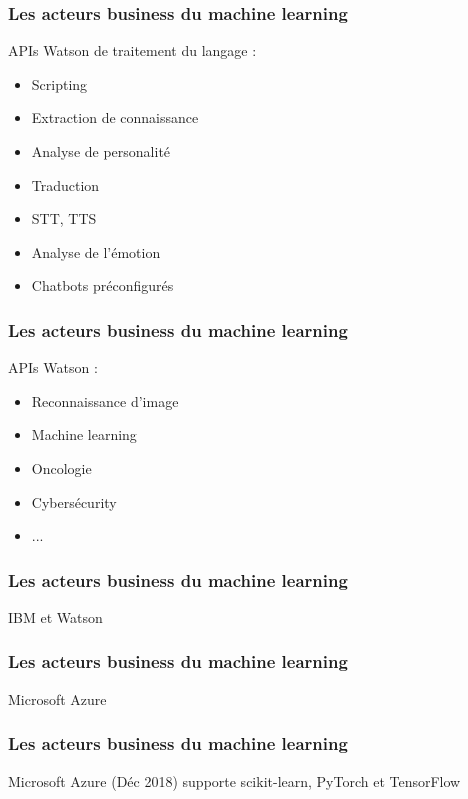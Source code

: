 \begin{frame}
  \frametitle{Les acteurs business du machine learning}
  APIs Watson de traitement du langage : \\
  \begin{minipage}[c]{0.49\linewidth}
    \begin{itemize}
    \item Scripting
    \item Extraction de connaissance
    \item Analyse de personalité
    \item Traduction
    \end{itemize}
  \end{minipage}\hfill
  \begin{minipage}[c]{0.50\linewidth}
    \begin{itemize}
    \item STT, TTS
    \item Analyse de l'émotion
    \item Chatbots préconfigurés
    \end{itemize}
  \end{minipage}\hfill
\end{frame}

\begin{frame}
  \frametitle{Les acteurs business du machine learning}
  APIs Watson :
  \begin{itemize}
  \item Reconnaissance d'image
  \item Machine learning
  \item Oncologie
  \item Cybersécurity
  \item ...
  \end{itemize}
\end{frame}

\begin{frame}
  \frametitle{Les acteurs business du machine learning}
  IBM et Watson
\end{frame}

\begin{frame}
  \frametitle{Les acteurs business du machine learning}
  Microsoft Azure
\end{frame}

\begin{frame}
  \frametitle{Les acteurs business du machine learning}
  Microsoft Azure
  \newline
  (Déc 2018) supporte scikit-learn, PyTorch et TensorFlow
\end{frame}

